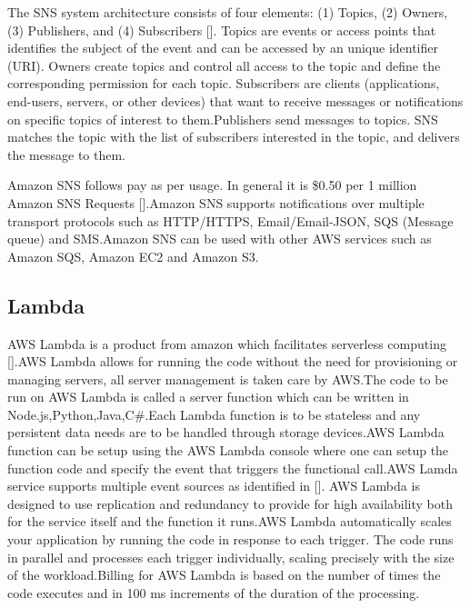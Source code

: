 The SNS system architecture consists of four elements: (1) Topics, (2)
Owners, (3) Publishers, and (4)
Subscribers [\cite{www-sns-blog}]. Topics are events or access points
that identifies the subject of the event and can be accessed by an
unique identifier (URI). Owners create topics and control all access
to the topic and define the corresponding permission for each
topic. Subscribers are clients (applications, end-users, servers, or
other devices) that want to receive messages or notifications on
specific topics of interest to them.Publishers send messages to
topics. SNS matches the topic with the list of subscribers interested
in the topic, and delivers the message to them.

Amazon SNS follows pay as per usage. In general it is \$0.50 per 1
million Amazon SNS Requests [\cite{www-sns-faq}].Amazon SNS supports
notifications over multiple transport protocols such as HTTP/HTTPS,
Email/Email-JSON, SQS (Message queue) and SMS.Amazon SNS can be used
with other AWS services such as Amazon SQS, Amazon EC2 and Amazon S3.



\subsection{Lambda}

AWS Lambda is a product from amazon which facilitates serverless
computing [\cite{www-awslambda}].AWS Lambda allows for running the code
without the need for provisioning or managing servers, all server
management is taken care by AWS.The code to be run on AWS Lambda is
called a server function which can be written in
Node.js,Python,Java,C\#.Each Lambda function is to be stateless and
any persistent data needs are to be handled through storage
devices.AWS Lambda function can be setup using the AWS Lambda console
where one can setup the function code and specify the event that
triggers the functional call.AWS Lamda service supports multiple event
sources as identified in [\cite{www-awslambdaevent}]. AWS Lambda is
designed to use replication and redundancy to provide for high
availability both for the service itself and the function it runs.AWS
Lambda automatically scales your application by running the code in
response to each trigger. The code runs in parallel and processes each
trigger individually, scaling precisely with the size of the
workload.Billing for AWS Lambda is based on the number of times the
code executes and in 100 ms increments of the duration of the
processing.

